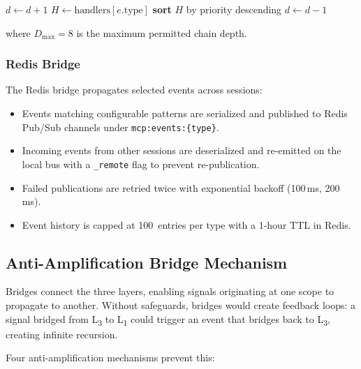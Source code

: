 \documentclass[journal,10pt]{IEEEtran}
\newcommand{\code}[1]{\texttt{#1}}
\newcommand{\layerthree}{L\textsubscript{3}}
\newcommand{\layerone}{L\textsubscript{1}}
\begin{document}
\begin{algorithm}[!t]
\caption{GlobalEventBus Dispatch}\label{alg:dispatch}
\SetAlgoLined
{}
$d \leftarrow d + 1$\;
$H \leftarrow \text{handlers}[e.\text{type}]$\;
\textbf{sort} $H$ by priority descending\;
$d \leftarrow d - 1$\;
\end{algorithm}

\noindent where $D_{\max} = 8$ is the maximum permitted chain depth.

\subsubsection{Redis Bridge}

The Redis bridge propagates selected events across sessions:

\begin{itemize}[nosep]
\item Events matching configurable patterns are serialized and published to Redis Pub/Sub channels under \code{mcp:events:\{type\}}.
\item Incoming events from other sessions are deserialized and re-emitted on the local bus with a \code{\_remote} flag to prevent re-publication.
\item Failed publications are retried twice with exponential backoff (100\,ms, 200\,ms).
\item Event history is capped at 100~entries per type with a 1-hour TTL in Redis.
\end{itemize}

\subsection{Anti-Amplification Bridge Mechanism}
\label{sec:bridges}

Bridges connect the three layers, enabling signals originating at one scope to propagate to another. Without safeguards, bridges would create feedback loops: a signal bridged from \layerthree{} to \layerone{} could trigger an event that bridges back to \layerthree{}, creating infinite recursion.

Four anti-amplification mechanisms prevent this:
\end{document}

